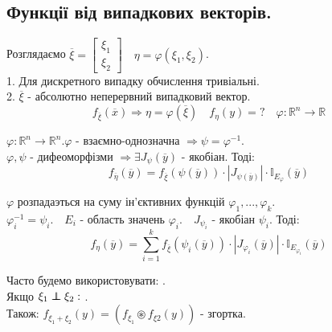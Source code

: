  \subsection{Функції від випадкових векторів.}
 Розглядаємо $ \overline{\xi} = \begin{bmatrix}
  \xi_1 \\
  \xi_2
 \end{bmatrix} \quad \eta = \varphi(\xi_1, \xi_2)$.\\
 1. Для дискретного випадку обчислення тривіальні.\\
 2. $ \overline{\xi} $ - абсолютно неперервний випадковий вектор.
 $$ f_{\overline{\xi}} (\overline{x}) \Rightarrow \eta = \varphi( \overline{\xi}) \quad f_{\eta} (y)=? \quad \varphi: \mathbb{R}^n \to \mathbb{R}$$
\begin{boxteo}
    $ \varphi: \mathbb{R}^n \to \mathbb{R}^n. \varphi$ - взаємно-однозначна $ \Rightarrow \psi = \varphi^{-1}$.\\
    $\varphi, \psi $ - дифеоморфізми $ \Rightarrow  \exists J_{\psi} ( \overline{y}) $ - якобіан. Тоді:
    $$
    f_{\overline{\eta}}  (\overline{y}) = f_{\overline{\xi}} (\psi(\overline{y})) \cdot \left| J_{\psi (\overline{y})} \right| \cdot   \mathbb{I}_{E_{\varphi}} (\overline{y})
    $$
\end{boxteo}
\begin{boxteo}
    $\varphi$ розпадаэться на суму ін'єктивних функцій  $\varphi_1, ..., \varphi_k$.\\
    $ \varphi^{-1}_i = \psi_i. \quad E_i$ - область значень $ \varphi_i. \quad J_{\psi_i}$ - якобіан $ \psi_i$. Тоді:
    $$
    f_{\eta} (\overline{y}) =  \sum\limits_{i = 1}^{ k}{ f_{\overline{\xi}} ( \psi_i( \overline{y})) \cdot \left| J_{\varphi_i } (\overline{y}) \right|  \cdot \mathbb{I}_{E_{\varphi_i}} (\overline{y})}
    $$
\end{boxteo}
Часто будемо використовувати: .\\
Якщо $ \xi_1 \independent \xi_2: $ .\\ Також: $f_{\xi_1 + \xi_2} (y) = (f_{\xi_1} \circledast f_{\xi2} (y))$ - згортка.
